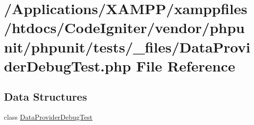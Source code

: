 \hypertarget{_data_provider_debug_test_8php}{}\section{/\+Applications/\+X\+A\+M\+P\+P/xamppfiles/htdocs/\+Code\+Igniter/vendor/phpunit/phpunit/tests/\+\_\+files/\+Data\+Provider\+Debug\+Test.php File Reference}
\label{_data_provider_debug_test_8php}
\subsection*{Data Structures}
\begin{DoxyCompactItemize}
\item 
class \mbox{\hyperlink{class_data_provider_debug_test}{Data\+Provider\+Debug\+Test}}
\end{DoxyCompactItemize}
